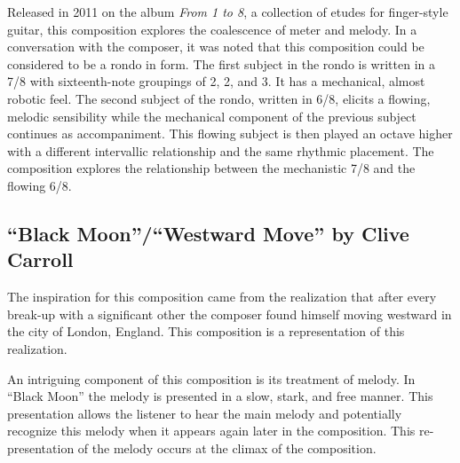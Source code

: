 \documentclass{tufte-handout}
\begin{document}
Released in 2011 on the album \emph{From 1 to 8}, a collection of etudes for
finger-style guitar, this composition explores the coalescence of meter and
melody. In a conversation with the composer, it was noted that this
composition could be considered to be a rondo in form. The first subject in
the rondo is written in a 7/8 with sixteenth-note groupings of 2, 2, and 3. It
has a mechanical, almost robotic feel. The second subject of the rondo,
written in 6/8, elicits a flowing, melodic sensibility while the mechanical
component of the previous subject continues as accompaniment. This flowing
subject is then played an octave higher with a different intervallic
relationship and the same rhythmic placement. The composition explores the
relationship between the mechanistic 7/8 and the flowing 6/8.

\subsection*{``Black Moon''/``Westward Move'' by Clive Carroll}
\label{sec:black-moonw-move}
The inspiration for this composition came from the realization that after
every break-up with a significant other the composer found himself moving
westward in the city of London, England. This composition is a representation
of this realization. 

An intriguing component of this composition is its treatment of melody. In
``Black Moon'' the melody is presented in a slow, stark, and free manner. This
presentation allows the listener to hear the main melody and potentially
recognize this melody when it appears again later in the composition. This
re-presentation of the melody occurs at the climax of the composition.  

\end{document}
